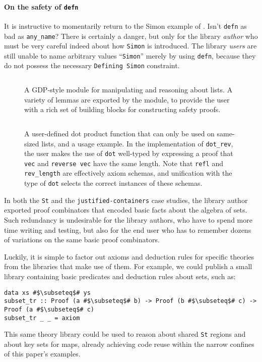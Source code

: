 \documentclass[format=sigplan, review=false, screen=true, 10pt]{acmart}
\makeatletter
\let\origsubsection\subsection
\renewcommand\subsection{\@ifstar{\starsubsection}{\nostarsubsection}}
\newcommand\nostarsubsection[1]
{\subsectionprelude\origsubsection{#1}\subsectionpostlude}
\newcommand\starsubsection[1]
{\subsectionprelude\origsubsection*{#1}\subsectionpostlude}
\newcommand\subsectionprelude{%
  \vspace{-0.25em}
}
\newcommand\subsectionpostlude{%
  \vspace{-0.05em}
}
\makeatother
\begin{document}
\paragraph{On the safety of \texttt{defn}} It is instructive to momentarily return to the Simon example of . Isn't \texttt{defn}
as bad as \texttt{any\_name}? There is certainly a danger, but only for the library \emph{author}
who must be very careful indeed about how \texttt{Simon} is introduced. The library
\emph{users} are still unable to name arbitrary values ``\texttt{Simon}'' merely by using \texttt{defn}, because
they do not possess the necessary \texttt{Defining Simon} constraint.

\begin{figure}[t]
    \inputminted{haskell}{ex1.hs}
    \caption{A GDP-style module for manipulating and reasoning about lists.
      A variety of lemmas are exported by the module, to provide the
      user with a rich set of building blocks for constructing safety proofs.
       \label{lemma-demo}}
\end{figure}
\begin{figure}
    \inputminted{haskell}{ex2.hs}
    \caption{A user-defined dot product function that can only be used on same-sized lists,
      and a usage example. In the implementation of \texttt{dot\_rev}, the user makes the use
      of \texttt{dot} well-typed by expressing a proof that
      \texttt{vec} and \texttt{reverse vec} have the same length.
      Note that \texttt{refl} and \texttt{rev\_length} are effectively axiom schemas, and unification with
      the type of \texttt{dot} selects the correct instances of these schemas.\label{dot-product}}
\end{figure}

\subsection{Building theory libraries}
In both the \texttt{St} and the \texttt{justified-containers} case studies,
the library author exported proof combinators that encoded basic facts about
the algebra of sets. Such redundancy is undesirable for the library authors,
who have to spend more time writing and testing, but also for the end user who has to remember dozens of
variations on the same basic proof combinators.

Luckily, it is simple to factor out axioms and deduction rules for specific theories
from the libraries that make use of them. For example, we could publish a small
library containing basic predicates and deduction rules about sets, such as:
\begin{verbatim}
data xs #$\subseteq$# ys
subset_tr :: Proof (a #$\subseteq$# b) -> Proof (b #$\subseteq$# c) -> Proof (a #$\subseteq$# c)
subset_tr _ _ = axiom
\end{verbatim}
This same theory library could be used to reason about shared \texttt{St}
regions and about key sets for maps, already achieving code reuse within
the narrow confines of this paper's examples.
\end{document}
